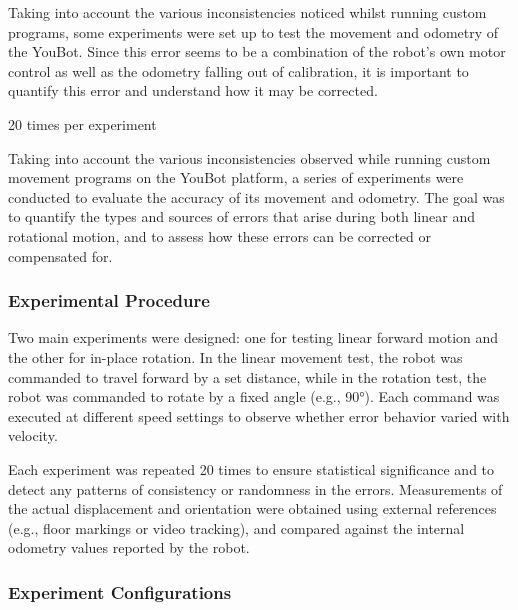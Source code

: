 \documentclass[a4paper, 12pt]{article}
\newif\ifshownotes
\newcommand{\notes}[1]{\ifshownotes\textcolor{blue}{#1}\fi}
\begin{document}
    \notes{here, ill discuss the experimental setup for testing movement and odometry.  this should include the two experiments of moving linearly and rotating, and discuss how error is calculated. probably discuss negative feedback and PID control as well, random, percentage, consistent error, etc.}

    Taking into account the various inconsistencies noticed whilst running custom programs, some experiments were set up to test the movement and odometry of the YouBot. Since this error seems to be a combination of the robot's own motor control as well as the odometry falling out of calibration, it is important to quantify this error and understand how it may be corrected. 



    \notes{different speeds? proportional or fixed error? does the odometry also drift?}

    20 times per experiment

    Taking into account the various inconsistencies observed while running custom movement programs on the YouBot platform, a series of experiments were conducted to evaluate the accuracy of its movement and odometry. The goal was to quantify the types and sources of errors that arise during both linear and rotational motion, and to assess how these errors can be corrected or compensated for.

    \subsubsection*{Experimental Procedure}

    Two main experiments were designed: one for testing linear forward motion and the other for in-place rotation. In the linear movement test, the robot was commanded to travel forward by a set distance, while in the rotation test, the robot was commanded to rotate by a fixed angle (e.g., 90°). Each command was executed at different speed settings to observe whether error behavior varied with velocity.

    Each experiment was repeated 20 times to ensure statistical significance and to detect any patterns of consistency or randomness in the errors. Measurements of the actual displacement and orientation were obtained using external references (e.g., floor markings or video tracking), and compared against the internal odometry values reported by the robot.

    \subsubsection*{Experiment Configurations}
\end{document}
